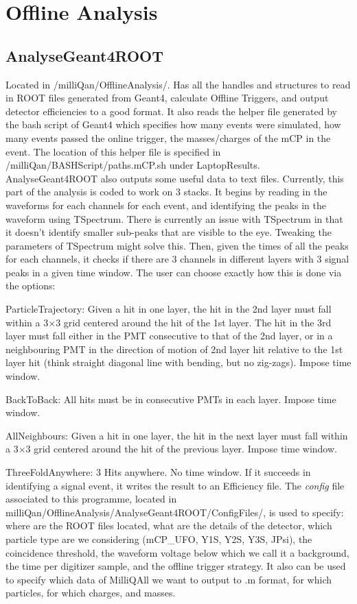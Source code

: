 \documentclass[prd,noshowpacs,nofootinbib,amsmath,amssymb,superscriptaddress]{revtex4}
\begin{document}
\section{Offline Analysis}
\subsection{AnalyseGeant4ROOT}
Located in /milliQan/OfflineAnalysis/. Has all the handles and structures to read in ROOT files generated from Geant4, calculate Offline Triggers, and output detector efficiencies to a good format. It also reads the helper file generated by the bash script of Geant4 which specifies how many events were simulated, how many events passed the online trigger, the masses/charges of the mCP in the event. The location of this helper file is specified in /milliQan/BASHScript/paths.mCP.sh under LaptopResults. AnalyseGeant4ROOT also outputs some useful data to text files. Currently, this part of the analysis is coded to work on 3 stacks. It begins by reading in the waveforms for each channels for each event, and identifying the peaks in the waveform using TSpectrum. There is currently an issue with TSpectrum in that it doesn't identify smaller sub-peaks that are visible to the eye. Tweaking the parameters of TSpectrum might solve this. Then, given the times of all the peaks for each channels, it checks if there are 3 channels in different layers with 3 signal peaks in a given time window. The user can choose exactly how this is done via the options:
\bi
\item ParticleTrajectory: Given a hit in one layer, the hit in the 2nd layer must fall within a 3$\times$3 grid centered around the hit of the 1st layer. The hit in the 3rd layer must fall either in the PMT consecutive to that of the 2nd layer, or in a neighbouring PMT in the direction of motion of 2nd layer hit relative to the 1st layer hit (think straight diagonal line with bending, but no zig-zags). Impose time window.  
\item BackToBack: All hits must be in consecutive PMTs in each layer. Impose time window.
\item AllNeighbours: Given a hit in one layer, the hit in the next layer must fall within a 3$\times$3 grid centered around the hit of the previous layer. Impose time window.
\item ThreeFoldAnywhere: 3 Hits anywhere. No time window.
\ei
If it succeeds in identifying a signal event, it writes the result to an Efficiency file. The \emph{config} file associated to this programme, located in milliQan/OfflineAnalysis/AnalyseGeant4ROOT/ConfigFiles/, is used to specify: where are the ROOT files located, what are the details of the detector, which particle type are we considering (mCP\_UFO, Y1S, Y2S, Y3S, JPsi), the coincidence threshold, the waveform voltage below which we call it a background, the time per digitizer sample, and the offline trigger strategy. It also can be used to specify which data of MilliQAll we want to output to .m format, for which particles, for which charges, and masses.  \\
\end{document}
